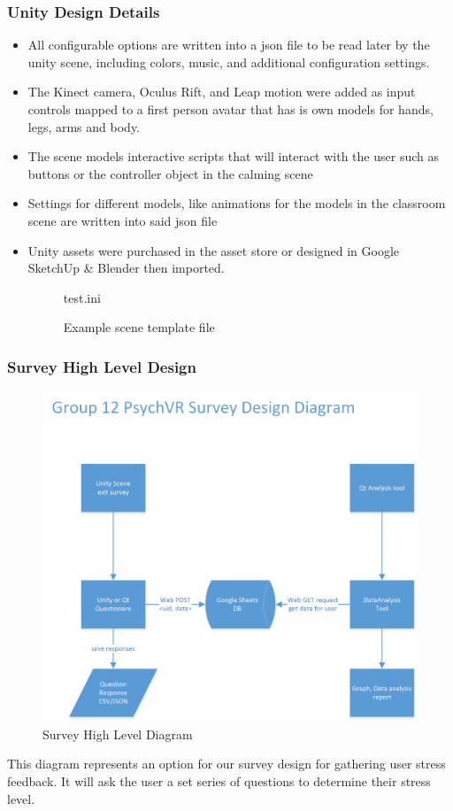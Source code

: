 \documentclass[a4paper,10pt]{article}
\begin{document}
		\subsubsection{Unity Design Details}	
\begin{itemize}
	\item All configurable options are written into a json file to be read later by the unity scene, including colors, music, and additional configuration settings.
	\item The Kinect camera, Oculus Rift, and Leap motion were added as input controls mapped to a first person avatar that has is own models for hands, legs, arms and body. 
	\item The scene models interactive scripts that will interact with the user such as buttons or the controller object in the calming scene
	\item Settings for different models, like animations for the models in the classroom scene are written into said json file
	\item Unity assets were purchased in the asset store or designed in Google SketchUp \& Blender then imported. 
\begin{figure}[H]
	 {test.ini}
	\caption{Example scene template file}
	\label{fig:sceneTemplate}
\end{figure}
\end{itemize}	
		\pagebreak
		\subsubsection{Survey High Level Design}
			\begin{figure}[H]
					\centerline{\includegraphics[]{survey.png}}
					\caption{Survey High Level Diagram}
					\label{fig:surveyDiag}
				\end{figure}
				This diagram represents an option for our survey design for gathering user stress feedback. It will ask the user a set series of questions to determine their stress level.
\pagebreak
\end{document}

